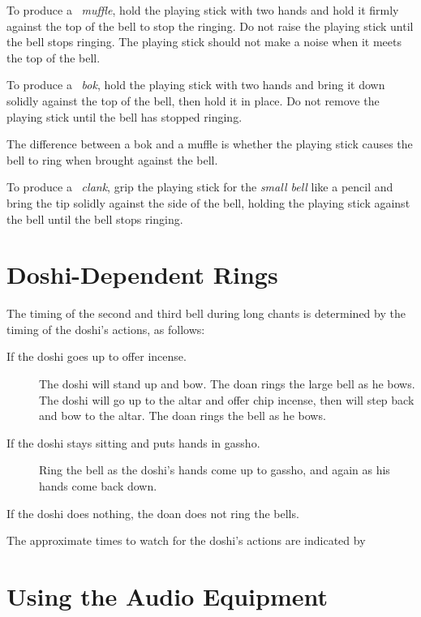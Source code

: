 \documentclass{chantbook}
\begin{document}
To produce a \muffle\ \emph{muffle}, hold the playing stick with two hands and hold it
firmly against the top of the bell to stop the ringing. Do not raise the
playing stick until the bell stops ringing. The playing stick should not make a
noise when it meets the top of the bell.

To produce a \bok\ \emph{bok}, hold the playing stick with two hands and bring it
down solidly against the top of the bell, then hold it in place. Do not remove
the playing stick until the bell has stopped ringing.

The difference between a bok and a muffle is whether the playing stick causes
the bell to ring when brought against the bell.

To produce a \clank\ \emph{clank}, grip the playing stick for the \emph{small bell}
like a pencil and bring the tip solidly against the side of the bell, holding
the playing stick against the bell until the bell stops ringing.

\section*{Doshi-Dependent Rings}
The timing of the second and third bell during long chants is determined by the
timing of the doshi's actions, as follows:

\begin{description}
\item[If the doshi goes up to offer incense.] The doshi will stand up and bow.
The doan rings the large bell as he bows. The doshi will go up to the altar and
offer chip incense, then will step back and bow to the altar. The doan rings
the bell as he bows.
\item[If the doshi stays sitting and puts hands in gassho.] Ring the bell as
the doshi's hands come up to gassho, and again as his hands come back down.
\end{description}

If the doshi does nothing, the doan does not ring the bells.

The approximate times to watch for the doshi's actions are indicated by

\section*{Using the Audio Equipment}
\end{document}
